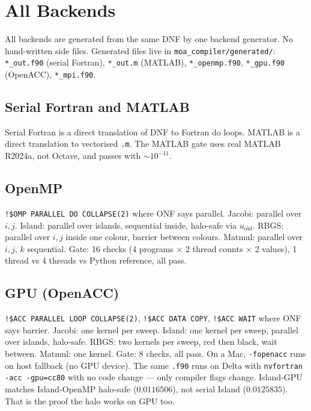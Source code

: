 \documentclass[11pt]{article}
\begin{document}
\section{All Backends}
All backends are generated from the same DNF by one backend generator.
No hand-written side files. Generated files live in
\texttt{moa\_compiler/generated/}: \texttt{*\_out.f90} (serial Fortran),
\texttt{*\_out.m} (MATLAB), \texttt{*\_openmp.f90}, \texttt{*\_gpu.f90}
(OpenACC), \texttt{*\_mpi.f90}.

\subsection{Serial Fortran and MATLAB}
Serial Fortran is a direct translation of DNF to Fortran do loops. MATLAB
is a direct translation to vectorised \texttt{.m}. The MATLAB gate uses real
MATLAB R2024a, not Octave, and passes with $\sim 10^{-11}$.

\subsection{OpenMP}
\texttt{!\$OMP PARALLEL DO COLLAPSE(2)} where ONF says parallel. Jacobi:
parallel over $i,j$. Island: parallel over islands, sequential inside,
halo-safe via $u_{\mathrm{old}}$. RBGS: parallel over $i,j$ inside one
colour, barrier between colours. Matmul: parallel over $i,j$, $k$ sequential.
Gate: 16 checks (4 programs $\times$ 2 thread counts $\times$ 2 values),
1 thread vs 4 threads vs Python reference, all pass.

\subsection{GPU (OpenACC)}
\texttt{!\$ACC PARALLEL LOOP COLLAPSE(2)}, \texttt{!\$ACC DATA COPY},
\texttt{!\$ACC WAIT} where ONF says barrier. Jacobi: one kernel per sweep.
Island: one kernel per sweep, parallel over islands, halo-safe. RBGS: two
kernels per sweep, red then black, wait between. Matmul: one kernel.
Gate: 8 checks, all pass. On a Mac, \texttt{-fopenacc} runs on host fallback
(no GPU device). The same \texttt{.f90} runs on Delta with
\texttt{nvfortran -acc -gpu=cc80} with no code change --- only compiler
flags change. Island-GPU matches Island-OpenMP halo-safe ($0.0116506$),
not serial Island ($0.0125835$). That is the proof the halo works on GPU too.
\end{document}
